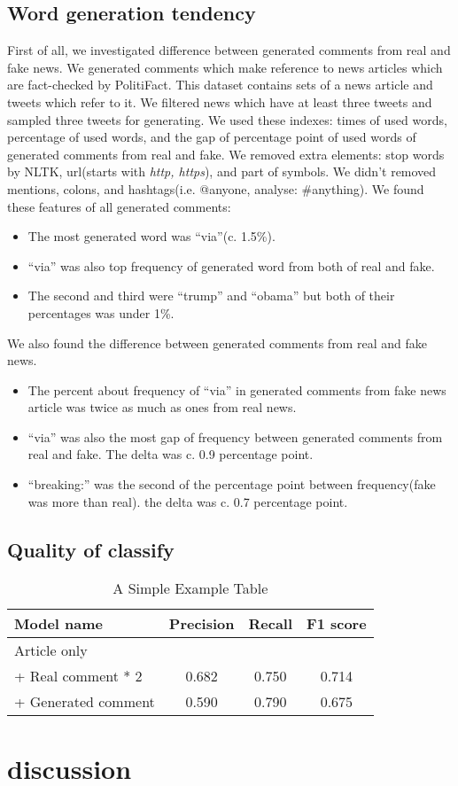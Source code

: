 \documentclass[conference]{IEEEtran}
\begin{document}
\subsection{Word generation tendency}
First of all, we investigated difference between generated comments from real and fake news.
We generated comments which make reference to news articles which are fact-checked by PolitiFact.
This dataset contains sets of a news article and tweets which refer to it.
We filtered news which have at least three tweets and sampled three tweets for generating.
We used these indexes: times of used words, percentage of used words, and the gap of percentage point of used words of generated comments from real and fake.
We removed extra elements: stop words by NLTK, url(starts with \textit{http, https}), and part of symbols.
We didn't removed mentions, colons, and hashtags(i.e. @anyone, analyse: \#anything).
We found these features of all generated comments:
\begin{itemize}[]
    \item The most generated word was ``via''(c. 1.5\%).  
    \item ``via'' was also top frequency of generated word from both of real and fake. 
    \item The second and third were ``trump'' and ``obama'' but both of their percentages was under 1\%.
\end{itemize}
We also found the difference between generated comments from real and fake news.
\begin{itemize}[]
    \item The percent about frequency of ``via'' in generated comments from fake news article was twice as much as ones from real news.
    \item ``via'' was also the most gap of frequency between generated comments from real and fake.  The delta was c. 0.9 percentage point.
    \item ``breaking:'' was the second of the percentage point between frequency(fake was more than real). the delta was c. 0.7 percentage point.
\end{itemize}
\subsection{Quality of classify}

\begin{table}[!t]
    \renewcommand{\arraystretch}{1.3}
    \caption{A Simple Example Table}
    \label{classify_results}
    \centering
    \begin{tabular}{lccc}
    \hline 
    Model name                                     & Precision & Recall & F1 score \\ \hline
    Article only                                   &           &        &          \\
     + Real comment * 2                     & 0.682     & 0.750  & 0.714    \\
     + Generated comment & 0.590     & 0.790  & 0.675    \\ \hline
    \end{tabular}
    \end{table}
\section{discussion}



\end{document}
